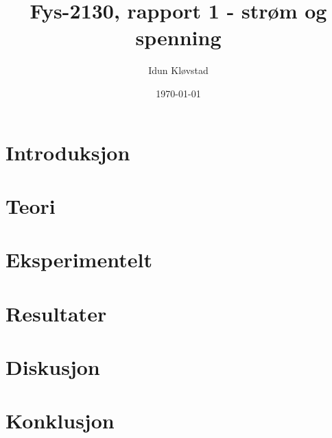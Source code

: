\documentclass[a4paper,norsk,12pt,oneside]{article}
\title{Fys-2130, rapport 1 - strøm og spenning}
\author{Idun Kløvstad}
\date{\today}
\begin{document}
\maketitle
\newpage

\begin{abstract}
\end{abstract}

\section{Introduksjon}

\section{Teori}

\section{Eksperimentelt}

\section{Resultater}

\section{Diskusjon}

\section{Konklusjon}


\end{document}
